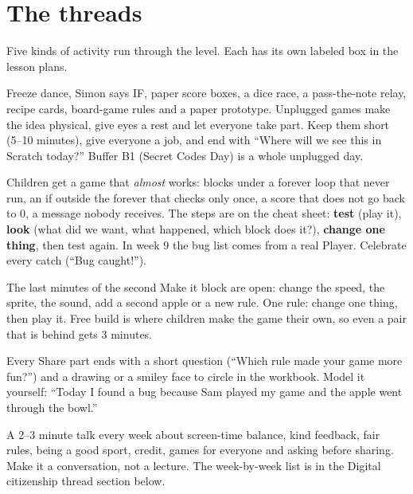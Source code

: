 \documentclass[track=junior,level=2,teacher]{kidscode}
\begin{document}
\section{The threads}
Five kinds of activity run through the level. Each has its own labeled box in the lesson plans.

\begin{unplugged}[No computer]
Freeze dance, Simon says IF, paper score boxes, a dice race, a pass-the-note relay, recipe cards,
board-game rules and a paper prototype. Unplugged games make the idea physical, give eyes a rest
and let everyone take part. Keep them short (5--10 minutes), give everyone a job, and end with
\enquote{Where will we see this in Scratch today?} Buffer B1 (Secret Codes Day) is a whole unplugged day.
\end{unplugged}

\begin{bughunt}
Children get a game that \emph{almost} works: blocks under a forever loop that never run, an if
outside the forever that checks only once, a score that does not go back to 0, a message nobody
receives. The steps are on the cheat sheet: \textbf{test} (play it), \textbf{look} (what did we want,
what happened, which block does it?), \textbf{change one thing}, then test again. In week 9 the bug
list comes from a real Player. Celebrate every catch (\enquote{Bug caught!}).
\end{bughunt}

\begin{freebuild}
The last minutes of the second Make it block are open: change the speed, the sprite, the sound,
add a second apple or a new rule. One rule: change one thing, then play it. Free build is where
children make the game their own, so even a pair that is behind gets 3 minutes.
\end{freebuild}

\begin{reflection}
Every Share part ends with a short question (\enquote{Which rule made your game more fun?}) and a
drawing or a smiley face to circle in the workbook. Model it yourself:
\enquote{Today I found a bug because Sam played my game and the apple went through the bowl.}
\end{reflection}

\begin{safety}
A 2--3 minute talk every week about screen-time balance, kind feedback, fair rules, being a good
sport, credit, games for everyone and asking before sharing. Make it a conversation, not a lecture.
The week-by-week list is in the Digital citizenship thread section below.
\end{safety}
\end{document}

